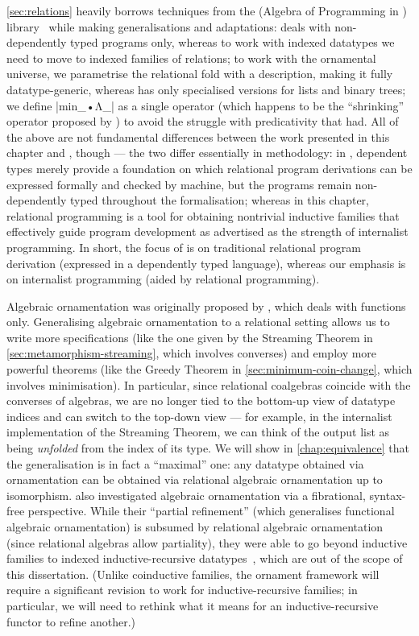 \autoref{sec:relations} heavily borrows techniques from the  (Algebra of Programming in \Agda) library~\citep{Mu-AoPA} while making generalisations and adaptations:
 deals with non-dependently typed programs only, whereas to work with indexed datatypes we need to move to indexed families of relations; to work with the ornamental universe, we parametrise the relational fold with a description, making it fully datatype-generic, whereas  has only specialised versions for lists and binary trees; we define |min_•Λ_| as a single operator (which happens to be the ``shrinking'' operator proposed by \citet{Mu-Galois}) to avoid the struggle with predicativity that  had.
All of the above are not fundamental differences between the work presented in this chapter and , though --- the two differ essentially in methodology: in , dependent types merely provide a foundation on which relational program derivations can be expressed formally and checked by machine, but the programs remain non-dependently typed throughout the formalisation; whereas in this chapter, relational programming is a tool for obtaining nontrivial inductive families that effectively guide program development as advertised as the strength of internalist programming.
In short, the focus of  is on traditional relational program derivation (expressed in a dependently typed language), whereas our emphasis is on internalist programming (aided by relational programming).

Algebraic ornamentation was originally proposed by \citet{McBride-ornaments}, which deals with functions only.
Generalising algebraic ornamentation to a relational setting allows us to write more specifications (like the one given by the Streaming Theorem in \autoref{sec:metamorphism-streaming}, which involves converses) and employ more powerful theorems (like the Greedy Theorem in \autoref{sec:minimum-coin-change}, which involves minimisation).
In particular, since relational coalgebras coincide with the converses of algebras, we are no longer tied to the bottom-up view of datatype indices and can switch to the top-down view --- for example, in the internalist implementation of the Streaming Theorem, we can think of the output list as being \emph{unfolded} from the index of its type.
We will show in \autoref{chap:equivalence} that the generalisation is in fact a ``maximal'' one: any datatype obtained via ornamentation can be obtained via relational algebraic ornamentation up to isomorphism.
\citet{Atkey-refining-inductive-types} also investigated algebraic ornamentation via a fibrational, syntax-free perspective.
While their ``partial refinement'' (which generalises functional algebraic ornamentation) is subsumed by relational algebraic ornamentation (since relational algebras allow partiality), they were able to go beyond inductive families to indexed inductive-recursive datatypes~\citep{Dybjer-indexed-induction-recursion}, which are out of the scope of this dissertation.
(Unlike coinductive families, the ornament framework will require a significant revision to work for inductive-recursive families; in particular, we will need to rethink what it means for an inductive-recursive functor to refine another.)

